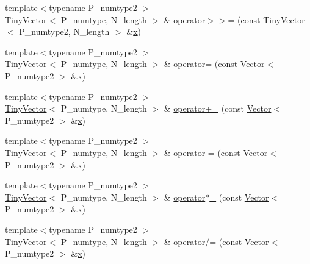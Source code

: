\begin{DoxyCompactItemize}
\item 
{\footnotesize template$<$typename P\+\_\+numtype2 $>$ }\\\hyperlink{classTinyVector}{Tiny\+Vector}$<$ P\+\_\+numtype, N\+\_\+length $>$ \& \hyperlink{classTinyVector_a6c608cabb11ffefecd06911a36d03346}{operator$>$$>$=} (const \hyperlink{classTinyVector}{Tiny\+Vector}$<$ P\+\_\+numtype2, N\+\_\+length $>$ \&\hyperlink{vecnorm1_8cc_ac73eed9e41ec09d58f112f06c2d6cb63}{x})
\item 
{\footnotesize template$<$typename P\+\_\+numtype2 $>$ }\\\hyperlink{classTinyVector}{Tiny\+Vector}$<$ P\+\_\+numtype, N\+\_\+length $>$ \& \hyperlink{classTinyVector_ab6c6fa1442461c9fec65578f90260d99}{operator=} (const \hyperlink{classVector}{Vector}$<$ P\+\_\+numtype2 $>$ \&\hyperlink{vecnorm1_8cc_ac73eed9e41ec09d58f112f06c2d6cb63}{x})
\item 
{\footnotesize template$<$typename P\+\_\+numtype2 $>$ }\\\hyperlink{classTinyVector}{Tiny\+Vector}$<$ P\+\_\+numtype, N\+\_\+length $>$ \& \hyperlink{classTinyVector_ae7c7af94b7d6bc13a16ab14c4e51c0ff}{operator+=} (const \hyperlink{classVector}{Vector}$<$ P\+\_\+numtype2 $>$ \&\hyperlink{vecnorm1_8cc_ac73eed9e41ec09d58f112f06c2d6cb63}{x})
\item 
{\footnotesize template$<$typename P\+\_\+numtype2 $>$ }\\\hyperlink{classTinyVector}{Tiny\+Vector}$<$ P\+\_\+numtype, N\+\_\+length $>$ \& \hyperlink{classTinyVector_a698a025ada10aa1d43dab4801146fe8a}{operator-\/=} (const \hyperlink{classVector}{Vector}$<$ P\+\_\+numtype2 $>$ \&\hyperlink{vecnorm1_8cc_ac73eed9e41ec09d58f112f06c2d6cb63}{x})
\item 
{\footnotesize template$<$typename P\+\_\+numtype2 $>$ }\\\hyperlink{classTinyVector}{Tiny\+Vector}$<$ P\+\_\+numtype, N\+\_\+length $>$ \& \hyperlink{classTinyVector_a40632afdad5dfe4253a64692396ae189}{operator$\ast$=} (const \hyperlink{classVector}{Vector}$<$ P\+\_\+numtype2 $>$ \&\hyperlink{vecnorm1_8cc_ac73eed9e41ec09d58f112f06c2d6cb63}{x})
\item 
{\footnotesize template$<$typename P\+\_\+numtype2 $>$ }\\\hyperlink{classTinyVector}{Tiny\+Vector}$<$ P\+\_\+numtype, N\+\_\+length $>$ \& \hyperlink{classTinyVector_a5cefa711caa0f0b06541ceef2900f4ed}{operator/=} (const \hyperlink{classVector}{Vector}$<$ P\+\_\+numtype2 $>$ \&\hyperlink{vecnorm1_8cc_ac73eed9e41ec09d58f112f06c2d6cb63}{x})

\end{DoxyCompactItemize}
